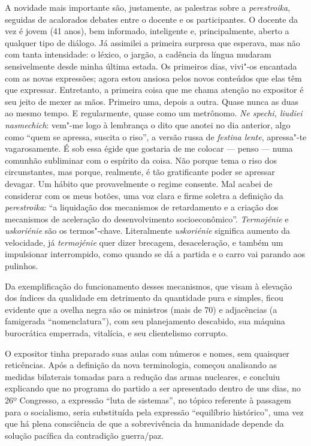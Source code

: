 A novidade mais importante são, justamente, as palestras sobre a \emph{perestroika}, seguidas de acalorados debates entre o docente e os participantes. O docente da vez é jovem (41 anos), bem informado, inteligente e, principalmente, aberto a qualquer tipo de diálogo. Já assimilei a primeira surpresa que esperava, mas não com tanta intensidade: o léxico, o jargão, a cadência da língua mudaram sensivelmente desde minha última estada. Os primeiros dias, vivi"-os encantada com as novas expressões; agora estou ansiosa pelos novos conteúdos que elas têm que expressar. Entretanto, a primeira coisa que me chama atenção no expositor é seu jeito de mexer as mãos. Primeiro uma, depois a outra. Quase nunca as duas ao mesmo tempo. E regularmente, quase como um metrônomo. \emph{Ne spechi, liudiei nasmechich}: vem"-me logo à lembrança o dito que anotei no dia anterior, algo como ``quem se apressa, suscita o riso'', a versão russa de \emph{festina lente}, apressa"-te vagarosamente. É sob essa égide que gostaria de me colocar --- penso --- numa comunhão subliminar com o espírito da coisa. Não porque tema o riso dos circunstantes, mas porque, realmente, é tão gratificante poder se apressar devagar. Um hábito que provavelmente o regime consente. Mal acabei de considerar com os meus botões, uma voz clara e firme soletra a definição da \emph{perestroika}: ``a liquidação dos mecanismos de retardamento e a criação dos mecanismos de aceleração do desenvolvimento socioeconômico''. \emph{Termojénie} e \emph{uskoriénie} são os termos"-chave. Literalmente \emph{uskoriénie} significa aumento da velocidade, já \emph{termojénie} quer dizer brecagem, desaceleração, e também um impulsionar interrompido, como quando se dá a partida e o carro vai parando aos pulinhos.

Da exemplificação do funcionamento desses mecanismos, que visam à elevação dos índices da qualidade em detrimento da quantidade pura e simples, ficou evidente que a ovelha negra são os ministros (mais de 70) e adjacências (a famigerada ``nomenclatura''), com seu planejamento descabido, sua máquina burocrática emperrada, vitalícia, e seu clientelismo corrupto.

O expositor tinha preparado suas aulas com números e nomes, sem quaisquer reticências. Após a definição da nova terminologia, começou analisando as medidas bilaterais tomadas para a redução das armas nucleares, e concluiu explicando que no programa do partido a ser apresentado dentro de uns dias, no 26º Congresso, a expressão ``luta de sistemas'', no tópico referente à passagem para o socialismo, seria substituída pela expressão ``equilíbrio histórico'', uma vez que há plena consciência de que a sobrevivência da humanidade depende da solução pacífica da contradição guerra/paz.

